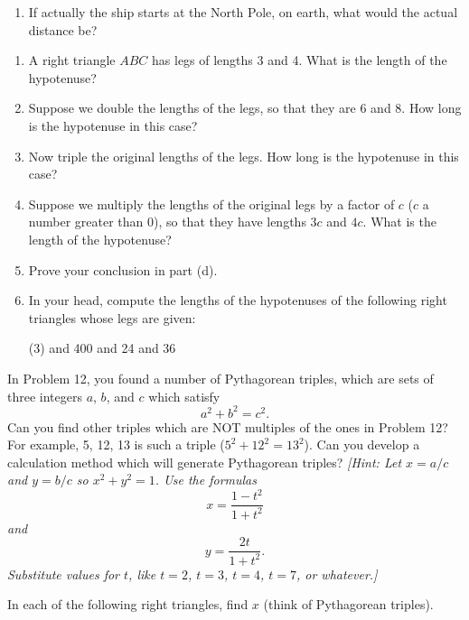 \documentclass[12pt]{book} %
\begin{document}
\begin{ExerciseList}
\begin{enumerate}

\item[(b)] If actually the ship starts at the North Pole, on earth, what would the actual distance be?
\end{enumerate}

\Exercise
\begin{enumerate}
\item[(a)] A right triangle $ABC$ has legs of lengths 3 and 4. What is the length of the hypotenuse?

\item[(b)] Suppose we double the lengths of the legs, so that they are 6 and 8. How long is the hypotenuse in this case?

\item[(c)] Now triple the original lengths of the legs. How long is the hypotenuse in this case?

\item[(d)] Suppose we multiply the lengths of the original legs by a factor of $c$ ($c$ a number greater than 0), so that they have lengths $3c$ and $4c$. What is the length of the hypotenuse?

\item[(e)] Prove your conclusion in part (d).

\item[(f)] In your head, compute the lengths of the hypotenuses of the following right triangles whose legs are given:
\begin{tasks}(3)
 and 400
 and 24
 and 36
\end{tasks}
\end{enumerate}

\Exercise In Problem 12, you found a number of Pythagorean triples, which are sets of three integers $a$, $b$, and $c$ which satisfy
\[
a^2+b^2=c^2.
\]
Can you find other triples which are NOT multiples of the ones in Problem 12? For example, 5, 12, 13 is such a triple ($5^2+12^2=13^2$). Can you develop a calculation method which will generate Pythagorean triples? \textit{[Hint: Let $x=a/c$ and $y=b/c$ so $x^2+y^2=1$. Use the formulas}
\[
x=\frac{1-t^2}{1+t^2}
\]
\textit{and}
\[
y=\frac{2t}{1+t^2}.
\]
\textit{Substitute values for $t$, like $t=2$, $t=3$, $t=4$, $t=7$, or whatever.]}

\Exercise In each of the following right triangles, find $x$ (think of Pythagorean triples).



\end{ExerciseList}
\end{document}

